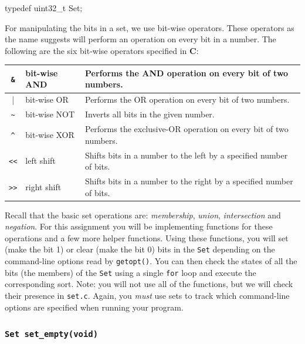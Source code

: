 \documentclass[11pt]{article}
\begin{document}
\begin{codelisting}{}
typedef uint32_t Set;
\end{codelisting}

For manipulating the bits in a set, we use bit-wise operators. These
operators as the name suggests will perform an operation on every bit in
a number. The following are the six bit-wise operators specified in
\textbf{C}:

\begin{center}
  \begin{tabular}{|c|l|l|}
    \hline
    \verb|&| & bit-wise AND & Performs the AND operation on every bit
    of two numbers. \\
    \hline
    \verb||| & bit-wise OR & Performs the OR operation on every bit of
    two numbers. \\
    \hline
    \verb|~| & bit-wise NOT & Inverts all bits in the given number. \\
    \hline
    \verb|^| & bit-wise XOR & Performs the exclusive-OR operation on
    every bit of two numbers. \\
    \hline
    \verb|<<| & left shift & Shifts bits in a number to the left by a
    specified number of bits. \\
    \hline
    \verb|>>| & right shift & Shifts bits in a number to the right by a
    specified number of bits. \\
    \hline
  \end{tabular}
\end{center}

\noindent Recall that the basic set operations are: \emph{membership},
\emph{union}, \emph{intersection} and \emph{negation}. For this
assignment you will be implementing functions for these operations and a
few more helper functions. Using these functions, you will set (make the
bit 1) or clear (make the bit 0) bits in the \texttt{Set} depending on
the command-line options read by \texttt{getopt()}. You can then check
the states of all the bits (the members) of the \texttt{Set} using a
single \texttt{for} loop and execute the corresponding sort. Note: you
will not use all of the functions, but we will check their presence in
\texttt{set.c}. Again, you \emph{must} use sets to track which
command-line options are specified when running your program.

\subsubsection{\texttt{Set set\_empty(void)}}
\end{document}
